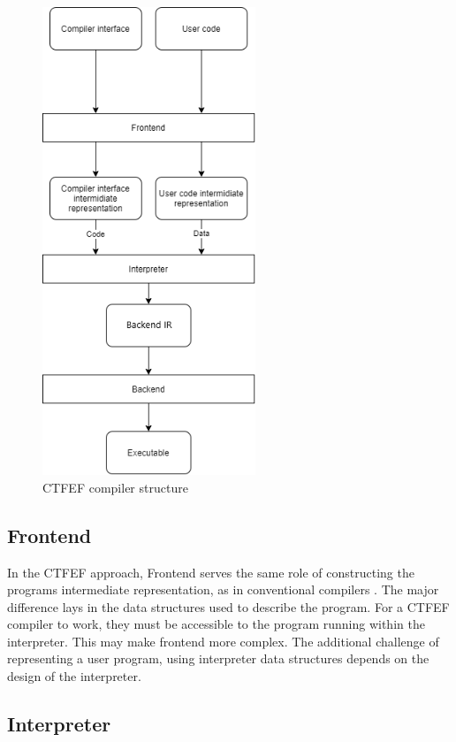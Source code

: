 \begin{figure}
	\includegraphics[height=14cm]{pictures/compiler-structure.png}
	\caption{CTFEF compiler structure}
	\label{CTFE-first-compiler-structure}
\end{figure}

\subsection{Frontend}
\label{Frontend}

In the CTFEF approach, Frontend serves the same role of constructing the programs intermediate representation, as in conventional compilers \cite{puntambekar:compiler_design}.
The major difference lays in the data structures used to describe the program.
For a CTFEF compiler to work, they must be accessible to the program running within the interpreter.
This may make frontend more complex.
The additional challenge of representing a user program, using interpreter data structures depends on the design of the interpreter.


\subsection{Interpreter}
\label{interpreter}

